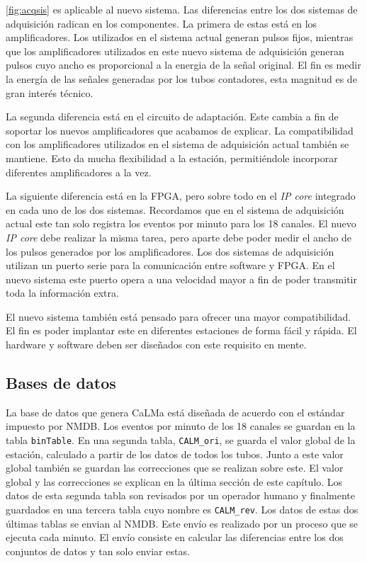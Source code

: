 		\ref{fig:acqsis} es aplicable al nuevo sistema. Las diferencias entre los dos sistemas de adquisición radican en los componentes. La
		primera de estas está en los amplificadores. Los utilizados en el sistema actual generan pulsos fijos, mientras que los amplificadores
		utilizados en este nuevo sistema de adquisición generan pulsos cuyo ancho es proporcional a la energia de la señal original. El fin es
		medir la energía de las señales generadas por los tubos contadores, esta magnitud es de gran interés técnico.
		\par
		La segunda diferencia está en el circuito de adaptación. Este cambia a fin de soportar los nuevos amplificadores que acabamos de
		explicar. La compatibilidad con los amplificadores utilizados en el sistema de adquisición actual también se mantiene. Esto da mucha
		flexibilidad a la estación, permitiéndole incorporar diferentes amplificadores a la vez.
		\par
		La siguiente diferencia está en la FPGA, pero sobre todo en el \emph{IP core} integrado en cada uno de los dos sistemas. Recordamos
		que en el sistema de adquisición actual este tan solo registra los eventos por minuto para los 18 canales. El nuevo \emph{IP core}
		debe realizar la misma tarea, pero aparte debe poder medir el ancho de los pulsos generados por los amplificadores. Los dos sistemas
		de adquisición utilizan un puerto serie para la comunicación entre software y FPGA. En el nuevo sistema este puerto opera a una
		velocidad mayor a fin de poder transmitir toda la información extra.
		\par
		El nuevo sistema también está pensado para ofrecer una mayor compatibilidad. El fin es poder implantar este en diferentes estaciones
		de forma fácil y rápida. El hardware y software deben ser diseñados con este requisito en mente.
	\subsection{Bases de datos}
		La base de datos que genera CaLMa está diseñada de acuerdo con el estándar impuesto por NMDB. Los eventos por minuto de los 18 canales
		se guardan en la tabla \texttt{binTable}. En una segunda tabla, \texttt{CALM\_ori}, se guarda el valor global de la estación, calculado
		a partir de los datos de todos los tubos. Junto a este valor global también se guardan las correcciones que se realizan sobre este. El
		valor global y las correcciones se explican en la última sección de este capítulo. Los datos de esta segunda tabla son revisados
		por un operador humano y finalmente guardados en una tercera tabla cuyo nombre es \texttt{CALM\_rev}. Los datos de estas dos últimas
		tablas se envian al NMDB. Este envío es realizado por un proceso que se ejecuta cada minuto. El envío consiste en calcular las
		diferencias entre los dos conjuntos de datos y tan solo enviar estas.
